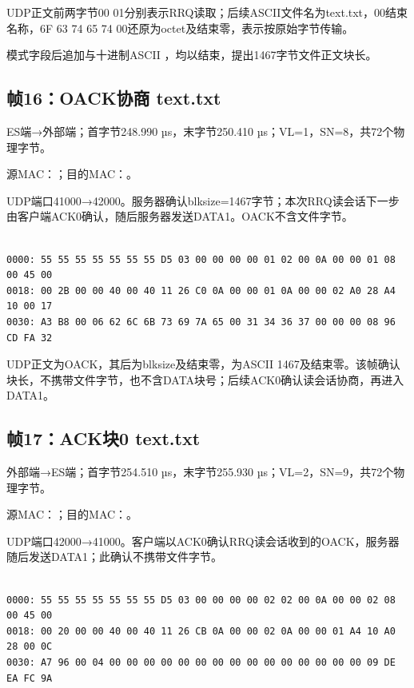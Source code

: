 UDP正文前两字节00 01分别表示RRQ读取；后续ASCII文件名为text.txt，00结束名称，6F 63 74 65 74 00还原为octet及结束零，表示按原始字节传输。

模式字段后追加与十进制ASCII ，均以结束，提出1467字节文件正文块长。

\subsection*{帧16：OACK协商 text.txt}

ES端→外部端；首字节248.990 µs，末字节250.410 µs；VL=1，SN=8，共72个物理字节。

源MAC：；目的MAC：。

UDP端口41000→42000。服务器确认blksize=1467字节；本次RRQ读会话下一步由客户端ACK0确认，随后服务器发送DATA1。OACK不含文件字节。

\par\noindent\begin{minipage}{\linewidth}
\begin{lstlisting}[caption={帧16物理字节，偏移0000--0047}]

0000: 55 55 55 55 55 55 55 D5 03 00 00 00 00 01 02 00 0A 00 00 01 08 00 45 00
0018: 00 2B 00 00 40 00 40 11 26 C0 0A 00 00 01 0A 00 00 02 A0 28 A4 10 00 17
0030: A3 B8 00 06 62 6C 6B 73 69 7A 65 00 31 34 36 37 00 00 00 08 96 CD FA 32

\end{lstlisting}
\end{minipage}\par

UDP正文为OACK，其后为blksize及结束零，为ASCII 1467及结束零。该帧确认块长，不携带文件字节，也不含DATA块号；后续ACK0确认读会话协商，再进入DATA1。

\subsection*{帧17：ACK块0 text.txt}

外部端→ES端；首字节254.510 µs，末字节255.930 µs；VL=2，SN=9，共72个物理字节。

源MAC：；目的MAC：。

UDP端口42000→41000。客户端以ACK0确认RRQ读会话收到的OACK，服务器随后发送DATA1；此确认不携带文件字节。

\par\noindent\begin{minipage}{\linewidth}
\begin{lstlisting}[caption={帧17物理字节，偏移0000--0047}]

0000: 55 55 55 55 55 55 55 D5 03 00 00 00 00 02 02 00 0A 00 00 02 08 00 45 00
0018: 00 20 00 00 40 00 40 11 26 CB 0A 00 00 02 0A 00 00 01 A4 10 A0 28 00 0C
0030: A7 96 00 04 00 00 00 00 00 00 00 00 00 00 00 00 00 00 00 09 DE EA FC 9A

\end{lstlisting}
\end{minipage}\par

